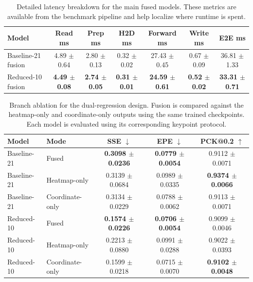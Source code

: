 \documentclass[10pt,letterpaper]{article}
\begin{document}
\begin{table}[H]
\centering
\footnotesize
\caption{Detailed latency breakdown for the main fused models. These metrics are available from the benchmark pipeline and help localize where runtime is spent.}
\label{tab:latency_breakdown}
\begin{tabular}{lcccccc}
\toprule
Model & Read ms & Prep ms & H2D ms & Forward ms & Write ms & E2E ms \\
\midrule
Baseline-21 fusion & 4.89 $\pm$ 0.64 & 2.80 $\pm$ 0.13 & 0.32 $\pm$ 0.02 & 27.43 $\pm$ 0.45 & 0.67 $\pm$ 0.09 & 36.81 $\pm$ 1.33 \\
Reduced-10 fusion & \textbf{4.49 $\pm$ 0.08} & \textbf{2.74 $\pm$ 0.05} & \textbf{0.31 $\pm$ 0.01} & \textbf{24.59 $\pm$ 0.61} & \textbf{0.52 $\pm$ 0.02} & \textbf{33.31 $\pm$ 0.71} \\
\bottomrule
\end{tabular}
\end{table}

\begin{table}[H]
\centering
\footnotesize
\caption{Branch ablation for the dual-regression design. Fusion is compared against the heatmap-only and coordinate-only outputs using the same trained checkpoints. Each model is evaluated using its corresponding keypoint protocol.}
\label{tab:branch_ablation}
\begin{tabular}{llccc}
\toprule
Model & Mode & SSE $\downarrow$ & EPE $\downarrow$ & PCK@0.2 $\uparrow$ \\
\midrule
Baseline-21 & Fused & \textbf{0.3098 $\pm$ 0.0236} & \textbf{0.0779 $\pm$ 0.0054} & 0.9112 $\pm$ 0.0071 \\
Baseline-21 & Heatmap-only & 0.3139 $\pm$ 0.0684 & 0.0989 $\pm$ 0.0335 & \textbf{0.9374 $\pm$ 0.0066} \\
Baseline-21 & Coordinate-only & 0.3134 $\pm$ 0.0229 & 0.0788 $\pm$ 0.0062 & 0.9113 $\pm$ 0.0071 \\
Reduced-10 & Fused & \textbf{0.1574 $\pm$ 0.0226} & \textbf{0.0706 $\pm$ 0.0054} & 0.9099 $\pm$ 0.0046 \\
Reduced-10 & Heatmap-only & 0.2213 $\pm$ 0.0880 & 0.0991 $\pm$ 0.0288 & 0.9022 $\pm$ 0.0393 \\
Reduced-10 & Coordinate-only & 0.1599 $\pm$ 0.0218 & 0.0715 $\pm$ 0.0070 & \textbf{0.9102 $\pm$ 0.0048} \\
\bottomrule
\end{tabular}
\end{table}
\end{document}
